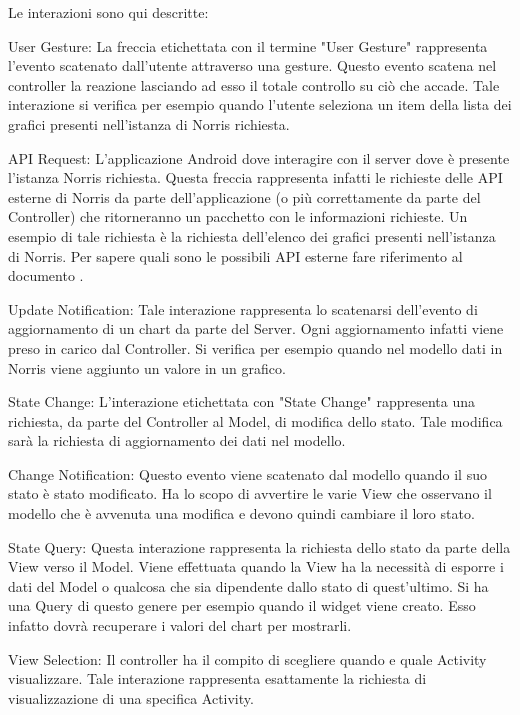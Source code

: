     	Le interazioni sono qui descritte:
    	\begin{description}
	    	\item{User Gesture:}
	    		La freccia etichettata con il termine "User Gesture" rappresenta l'evento scatenato dall'utente attraverso una gesture. Questo evento scatena nel controller la reazione lasciando ad esso il totale controllo su ciò che accade. Tale interazione si verifica per esempio quando l'utente seleziona un item della lista dei grafici presenti nell'istanza di Norris richiesta.
	    	\item{API Request:}
	    		L'applicazione Android dove interagire con il server dove è presente l'istanza Norris richiesta. Questa freccia rappresenta infatti le richieste delle API esterne di Norris da parte dell'applicazione (o più correttamente da parte del Controller) che ritorneranno un pacchetto con le informazioni richieste. Un esempio di tale richiesta è la richiesta dell'elenco dei grafici presenti nell'istanza di Norris. Per sapere quali sono le possibili API esterne fare riferimento al documento .
	    	\item{Update Notification:}
	    		Tale interazione rappresenta lo scatenarsi dell'evento di aggiornamento di un chart da parte del Server. Ogni aggiornamento infatti viene preso in carico dal Controller. Si verifica per esempio quando nel modello dati in Norris viene aggiunto un valore in un grafico.
	    	\item{State Change:}
	    		L'interazione etichettata con "State Change" rappresenta una richiesta, da parte del Controller al Model, di modifica dello stato. Tale modifica sarà la richiesta di aggiornamento dei dati nel modello.
	    	\item{Change Notification:}
	    		Questo evento viene scatenato dal modello quando il suo stato è stato modificato. Ha lo scopo di avvertire le varie View che osservano il modello che è avvenuta una modifica e devono quindi cambiare il loro stato.
	    	\item{State Query:}
	    		Questa interazione rappresenta la richiesta dello stato da parte della View verso il Model. Viene effettuata quando la View ha la necessità di esporre i dati del Model o qualcosa che sia dipendente dallo stato di quest'ultimo. Si ha una Query di questo genere per esempio quando il widget viene creato. Esso infatto dovrà recuperare i valori del chart per mostrarli.
	    	\item{View Selection:}
	    		Il controller ha il compito di scegliere quando e quale Activity visualizzare. Tale interazione rappresenta esattamente la richiesta di visualizzazione di una specifica Activity.
	    \end{description}

